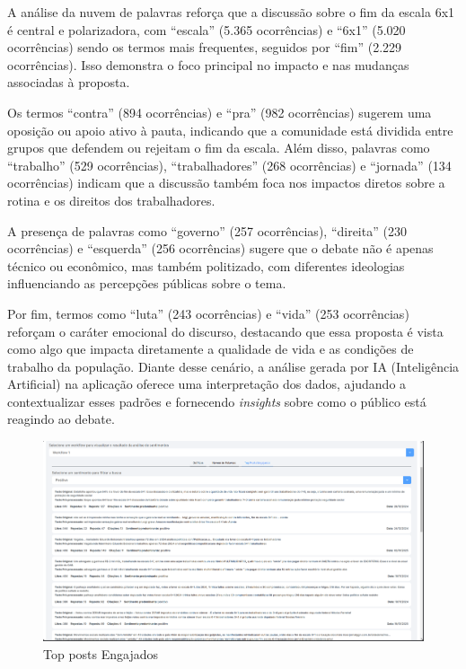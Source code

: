 \documentclass[
	12pt,				%
	oneside,			%
	a4paper,			%
	english,			%
	french,				%
	spanish,			%
	brazil				%
	]{abntex2}
\begin{document}
A análise da nuvem de palavras reforça que a discussão sobre o fim da
escala 6x1 é central e polarizadora, com ``escala'' (5.365 ocorrências)
e ``6x1'' (5.020 ocorrências) sendo os termos mais frequentes, seguidos
por ``fim'' (2.229 ocorrências). Isso demonstra o foco principal no
impacto e nas mudanças associadas à proposta.

Os termos ``contra'' (894 ocorrências) e ``pra'' (982 ocorrências)
sugerem uma oposição ou apoio ativo à pauta, indicando que a comunidade
está dividida entre grupos que defendem ou rejeitam o fim da escala.
Além disso, palavras como ``trabalho'' (529 ocorrências),
``trabalhadores'' (268 ocorrências) e ``jornada'' (134 ocorrências)
indicam que a discussão também foca nos impactos diretos sobre a rotina
e os direitos dos trabalhadores.

A presença de palavras como ``governo'' (257 ocorrências), ``direita''
(230 ocorrências) e ``esquerda'' (256 ocorrências) sugere que o debate
não é apenas técnico ou econômico, mas também politizado, com diferentes
ideologias influenciando as percepções públicas sobre o tema.

Por fim, termos como ``luta'' (243 ocorrências) e ``vida'' (253
ocorrências) reforçam o caráter emocional do discurso, destacando que
essa proposta é vista como algo que impacta diretamente a qualidade de
vida e as condições de trabalho da população. Diante desse cenário, a
análise gerada por IA (Inteligência Artificial) na aplicação oferece uma
interpretação dos dados, ajudando a contextualizar esses padrões e
fornecendo \emph{insights} sobre como o público está reagindo ao debate.

\begin{figure}[htbp]
\hypertarget{top_posts_engajados}{%
\caption{Top posts Engajados}\label{top_posts_engajados}
\begin{center}
\includegraphics[scale=0.2]{imagens/sentilytics/estudo-caso/top_posts_engajados.png}
\end{center}
}
\end{figure}
\end{document}
